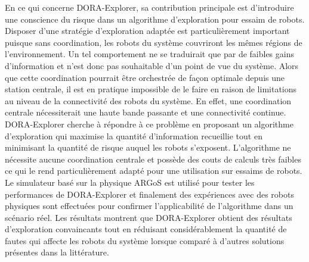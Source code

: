 En ce qui concerne DORA-Explorer, sa contribution principale est d'introduire une conscience du risque dans un algorithme d'exploration pour essaim de robots. Disposer d'une stratégie d'exploration adaptée est particulièrement important puisque sans coordination, les robots du système couvriront les mêmes régions de l'environnement. Un tel comportement ne se traduirait que par de faibles gains d'information et n'est donc pas souhaitable d'un point de vue du système. Alors que cette coordination pourrait être orchestrée de façon optimale depuis une station centrale, il est en pratique impossible de le faire en raison de limitations au niveau de la connectivité des robots du système. En effet, une coordination centrale nécessiterait une haute bande passante et une connectivité continue. DORA-Explorer cherche à répondre à ce problème en proposant un algorithme d'exploration qui maximise la quantité d'information recueillie tout en minimisant la quantité de risque auquel les robots s'exposent. L'algorithme ne nécessite aucune coordination centrale et possède des couts de calculs très faibles ce qui le rend particulièrement adapté pour une utilisation sur essaims de robots. Le simulateur basé sur la physique ARGoS est utilisé pour tester les performances de DORA-Explorer et finalement des expériences avec des robots physiques sont effectuées pour confirmer l'applicabilité de l’algorithme dans un scénario réel. Les résultats montrent que DORA-Explorer obtient des résultats d'exploration convaincants tout en réduisant considérablement la quantité de fautes qui affecte les robots du système lorsque comparé à d'autres solutions présentes dans la littérature.

